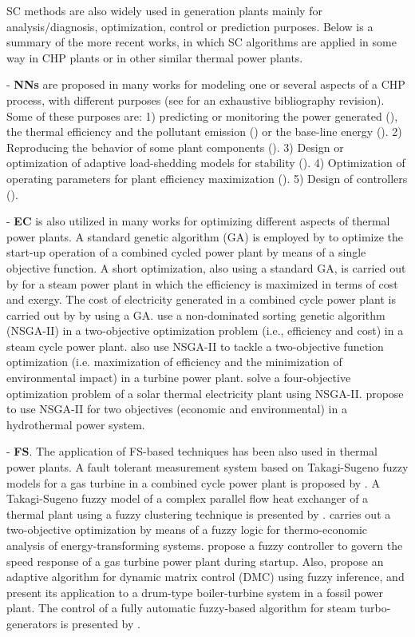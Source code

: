 SC methods are also widely used in generation plants mainly for analysis/diagnosis, optimization, control or prediction purposes. Below is a summary of the more recent works, in which SC algorithms are applied in some way in CHP plants or in other similar thermal power plants.

- \textbf{NNs} are proposed in many works for modeling one or several aspects of a CHP process, with different purposes  (see \cite{Rossi-2014} for an exhaustive bibliography revision). Some of these purposes are: 1) predicting or monitoring the power generated (\cite{De-2007,Smrekar-2010,Nikpey-2013,Sisworahardjo-2013}), the thermal efficiency and the pollutant emission (\cite{Flynn-2005,Pan-2007}) or the base-line energy (\cite{Rossi-2014}). 2) Reproducing the behavior of some plant components (\cite{Bekat-2012}). 3) Design or optimization of adaptive load-shedding models for stability (\cite{Kumar-2013}). 4) Optimization of operating parameters for plant efficiency maximization (\cite{Zomo-2011,Arslam-2011}). 5) Design of controllers (\cite{Wang-2008,Lee-2010}).

- \textbf{EC} is also utilized in many works for optimizing different aspects of thermal power plants. A standard genetic algorithm (GA) is employed by \cite{Bertini-12} to optimize the start-up operation of a combined cycled power plant by means of a single objective function. A short optimization, also using a standard GA, is carried out by \cite{Ameri-09} for a steam power plant in which the efficiency is maximized in terms of cost and exergy. The cost of electricity generated in a combined cycle power plant is carried out by \cite{Koch-2007} by using a GA. \cite{Haja-2012} use a non-dominated sorting genetic algorithm (NSGA-II) in a two-objective optimization problem (i.e., efficiency and cost) in a steam cycle power plant. \cite{Ahmadi-2011} also use NSGA-II to tackle a two-objective function optimization (i.e. maximization of efficiency and the minimization of environmental impact) in a turbine power plant. \cite{Deb2012} solve a four-objective optimization problem of a solar thermal electricity plant using NSGA-II. \cite{Basu-11} propose to use NSGA-II for two objectives (economic and environmental) in a hydrothermal power system. 

- \textbf{FS}. The application of FS-based techniques has been also used in thermal power plants. A fault tolerant measurement system based on Takagi-Sugeno fuzzy models for a gas turbine in a combined cycle power plant is proposed by \cite{Berrios-2011}. A Takagi-Sugeno fuzzy model of a complex parallel flow heat exchanger of a thermal plant using a fuzzy clustering technique is presented by \cite{Habi-2011}. \cite{Mazur-2009} carries out a two-objective optimization by means of a fuzzy logic for thermo-economic analysis of energy-transforming systems. \cite{Rodriguez-Martinez-2011} propose a fuzzy controller to govern the speed response of a gas turbine power plant during startup. Also, \cite{Moon-2011} propose an adaptive algorithm for dynamic matrix control (DMC) using fuzzy inference, and present its application to a drum-type boiler-turbine system in a fossil power plant. The control of a fully automatic fuzzy-based algorithm for steam turbo-generators is presented by \cite{Gunes-2010}.

